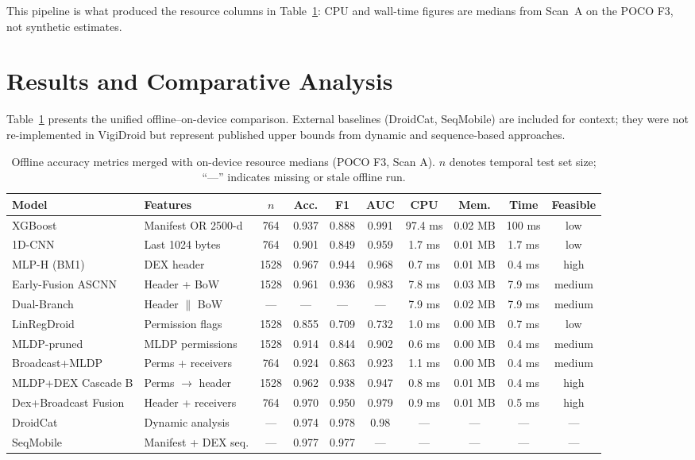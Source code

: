 This pipeline is what produced the resource columns in Table~\ref{tab:results}: CPU and wall-time figures are medians from Scan~A on the POCO F3, not synthetic estimates.

\section{Results and Comparative Analysis}
\label{sec:results-analysis}

Table~\ref{tab:results} presents the unified offline--on-device comparison. External baselines (DroidCat, SeqMobile) are included for context; they were not re-implemented in VigiDroid but represent published upper bounds from dynamic and sequence-based approaches.

\begin{table}[H]
\label{tab:results}
\centering
\scriptsize
\setlength{\tabcolsep}{5pt}
\begin{tabular}{@{}l p{2.6cm} c c c c c c c c@{}}
\toprule
\textbf{Model} & \textbf{Features} & \textbf{$n$} & \textbf{Acc.} & \textbf{F1} & \textbf{AUC} & \textbf{CPU} & \textbf{Mem.} & \textbf{Time} & \textbf{Feasible} \\
\midrule
XGBoost & Manifest OR 2500-d & 764 & 0.937 & 0.888 & 0.991 & 97.4 ms & 0.02 MB & 100 ms & low \\
1D-CNN & Last 1024 bytes & 764 & 0.901 & 0.849 & 0.959 & 1.7 ms & 0.01 MB & 1.7 ms & low \\
MLP-H (BM1) & DEX header & 1528 & 0.967 & 0.944 & 0.968 & 0.7 ms & 0.01 MB & 0.4 ms & high \\
Early-Fusion ASCNN & Header + BoW & 1528 & 0.961 & 0.936 & 0.983 & 7.8 ms & 0.03 MB & 7.9 ms & medium \\
Dual-Branch & Header $\|$ BoW & --- & --- & --- & --- & 7.9 ms & 0.02 MB & 7.9 ms & medium \\
LinRegDroid & Permission flags & 1528 & 0.855 & 0.709 & 0.732 & 1.0 ms & 0.00 MB & 0.7 ms & low \\
MLDP-pruned & MLDP permissions & 1528 & 0.914 & 0.844 & 0.902 & 0.6 ms & 0.00 MB & 0.4 ms & medium \\
Broadcast+MLDP & Perms + receivers & 764 & 0.924 & 0.863 & 0.923 & 1.1 ms & 0.00 MB & 0.4 ms & medium \\
MLDP+DEX Cascade B & Perms $\rightarrow$ header & 1528 & 0.962 & 0.938 & 0.947 & 0.8 ms & 0.01 MB & 0.4 ms & high \\
Dex+Broadcast Fusion & Header + receivers & 764 & 0.970 & 0.950 & 0.979 & 0.9 ms & 0.01 MB & 0.5 ms & high \\
DroidCat & Dynamic analysis & --- & 0.974 & 0.978 & 0.98 & --- & --- & --- & --- \\
SeqMobile & Manifest + DEX seq. & --- & 0.977 & 0.977 & --- & --- & --- & --- & --- \\
\bottomrule
\end{tabular}
\caption{Offline accuracy metrics merged with on-device resource medians (POCO F3, Scan A). $n$ denotes temporal test set size; ``---'' indicates missing or stale offline run.}
\end{table}

